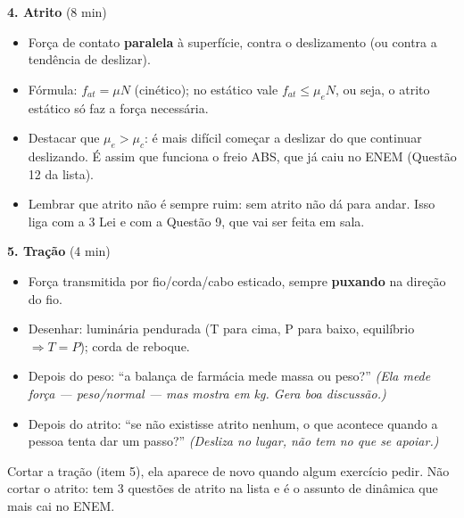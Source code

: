 \documentclass[11pt,a4paper]{article}
\begin{document}
\begin{quadro}
\medskip
\textbf{4. Atrito} (8 min)
\begin{itemize}[nosep]
  \item For\c{c}a de contato \textbf{paralela} \`a superf\'icie, contra
        o deslizamento (ou contra a tend\^encia de deslizar).
  \item F\'ormula: $f_{at} = \mu N$ (cin\'etico); no est\'atico vale
        $f_{at} \leq \mu_e N$, ou seja, o atrito est\'atico s\'o faz a
        for\c{c}a necess\'aria.
  \item Destacar que $\mu_e > \mu_c$: \'e mais dif\'icil come\c{c}ar a
        deslizar do que continuar deslizando. \'E assim que funciona o
        freio ABS, que j\'a caiu no ENEM (Quest\~ao 12 da lista).
  \item Lembrar que atrito n\~ao \'e sempre ruim: sem atrito n\~ao d\'a
        para andar. Isso liga com a 3\textordfeminine{} Lei e com a
        Quest\~ao 9, que vai ser feita em sala.
\end{itemize}

\medskip
\textbf{5. Tra\c{c}\~ao} (4 min)
\begin{itemize}[nosep]
  \item For\c{c}a transmitida por fio/corda/cabo esticado, sempre
        \textbf{puxando} na dire\c{c}\~ao do fio.
  \item Desenhar: lumin\'aria pendurada (T para cima, P para baixo,
        equil\'ibrio $\Rightarrow T = P$); corda de reboque.
\end{itemize}
\end{quadro}

\begin{perguntas}
\begin{itemize}[nosep]
  \item Depois do peso: ``a balan\c{c}a de farm\'acia mede massa ou
        peso?'' \textit{(Ela mede for\c{c}a --- peso/normal --- mas
        mostra em kg. Gera boa discuss\~ao.)}
  \item Depois do atrito: ``se n\~ao existisse atrito nenhum, o que
        acontece quando a pessoa tenta dar um passo?''
        \textit{(Desliza no lugar, n\~ao tem no que se apoiar.)}
\end{itemize}
\end{perguntas}

\begin{corte}
Cortar a tra\c{c}\~ao (item 5), ela aparece de novo quando algum
exerc\'icio pedir. N\~ao cortar o atrito: tem 3 quest\~oes de atrito na
lista e \'e o assunto de din\^amica que mais cai no ENEM.
\end{corte}
\end{document}
